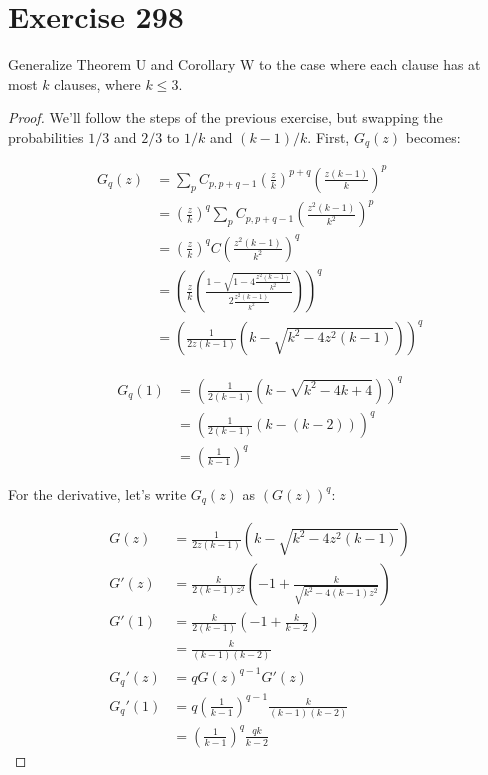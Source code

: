 \documentclass[10pt]{book}
\begin{document}
\section{Exercise 298}

Generalize Theorem U and Corollary W to the case where each clause has at most $k$ clauses, where $k\le 3$.

\begin{proof}
  We'll follow the steps of the previous exercise, but swapping the probabilities $1/3$ and $2/3$ to $1/k$ and $(k-1)/k$. First, $G_q(z)$ becomes:

  \begin{align*}
    G_q(z) &= \sum_p C_{p,p+q-1}\left(\frac{z}{k}\right)^{p+q}
      \left(\frac{z(k-1)}{k}\right)^p \\
      &= \left(\frac{z}{k}\right)^q 
      \sum_p C_{p,p+q-1}\left(\frac{z^2(k-1)}{k^2}\right)^p \\
      &= \left(\frac{z}{k}\right)^q C\left(\frac{z^2(k-1)}{k^2}\right)^q \\
      &= \left( 
      \frac{z}{k}\left(\frac{1-\sqrt{1-4\frac{z^2(k-1)}{k^2}}}
           {2\frac{z^2(k-1)}{k^2}} \right)
         \right)^q \\
      &= \left(\frac{1}{2z(k-1)}\left(k-\sqrt{k^2-4z^2(k-1)}\right)\right)^q
  \end{align*}

  \begin{align*}
    G_q(1) &= \left( \frac{1}{2(k-1)}\left(k-\sqrt{k^2-4k+4} \right)\right)^q\\
           &= \left( \frac{1}{2(k-1)}\left(k-(k-2) \right)\right)^q\\
           &= \left( \frac{1}{k-1}\right)^q
  \end{align*}

  For the derivative, let's write $G_q(z)$ as $\left(G(z)\right)^q$:

  \begin{align*}
    G(z) 
      &= \frac{1}{2z(k-1)}\left(k-\sqrt{k^2-4z^2(k-1)}\right) \\
    G'(z) 
      &= \frac{k}{2(k-1)z^2}\left(-1+\frac{k}{\sqrt{k^2-4(k-1)z^2}}\right) \\
    G'(1) 
      &= \frac{k}{2(k-1)}\left(-1+\frac{k}{k-2}\right)\\
      &= \frac{k}{(k-1)(k-2)} \\
    G_q'(z) &= qG(z)^{q-1}G'(z) \\
    G_q'(1) &= q\left(\frac{1}{k-1}\right)^{q-1}\frac{k}{(k-1)(k-2)} \\
      &= \left(\frac{1}{k-1}\right)^q \frac{qk}{k-2}
  \end{align*}


\end{proof}
\end{document}
